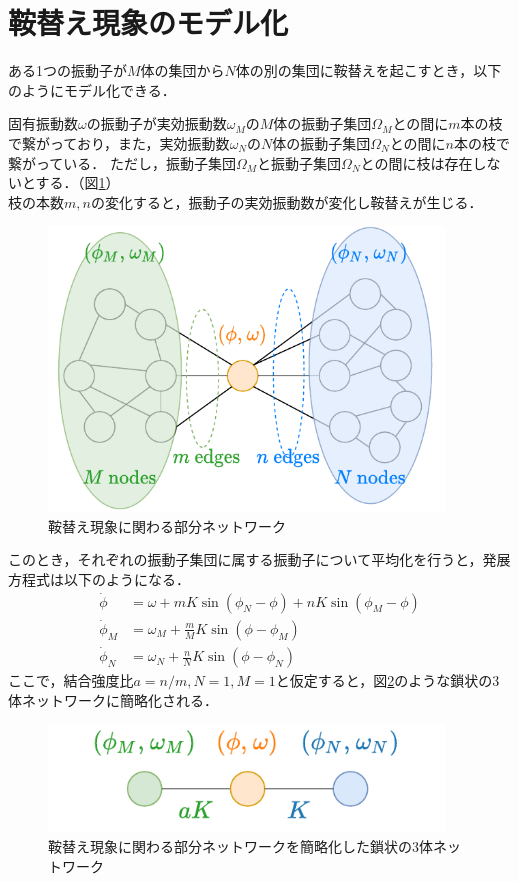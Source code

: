 \documentclass[../main]{subfiles}
\begin{document}
\section{鞍替え現象のモデル化}
ある1つの振動子が$M$体の集団から$N$体の別の集団に鞍替えを起こすとき，以下のようにモデル化できる．
\begin{screen}
固有振動数$\omega$の振動子が実効振動数$\omega_M$の$M$体の振動子集団$\Omega_M$との間に$m$本の枝で繋がっており，また，実効振動数$\omega_N$の$N$体の振動子集団$\Omega_N$との間に$n$本の枝で繋がっている．
ただし，振動子集団$\Omega_M$と振動子集団$\Omega_N$との間に枝は存在しないとする．（図\ref{fig:switch}）\\
枝の本数$m,n$の変化すると，振動子の実効振動数が変化し鞍替えが生じる．
\end{screen}
\begin{figure}[t]
\centering
\includegraphics[width=105mm]{./images/three_obj_before.pdf}
\centering
\caption{鞍替え現象に関わる部分ネットワーク}
\label{fig:switch}
\end{figure}
このとき，それぞれの振動子集団に属する振動子について平均化を行うと，発展方程式は以下のようになる．
\begin{align*}
    \dot{\phi}&=\omega+mK\sin\left( \phi_N-\phi \right)+nK\sin\left( \phi_M-\phi \right)\\
    \dot{\phi}_M&=\omega_M+\frac{m}{M}K\sin\left( \phi-\phi_M \right) \\
    \dot{\phi}_N&=\omega_N+\frac{n}{N}K\sin\left( \phi-\phi_N \right)    
\end{align*}
ここで，結合強度比$a=n/m,N=1,M=1$と仮定すると，図\ref{fig:3body}のような鎖状の3体ネットワークに簡略化される．
\begin{figure}[t]
\centering
\includegraphics[width=105mm]{./images/three_obj_after.pdf}
\centering
\caption{鞍替え現象に関わる部分ネットワークを簡略化した鎖状の3体ネットワーク}
\label{fig:3body}
\end{figure}
\end{document}
